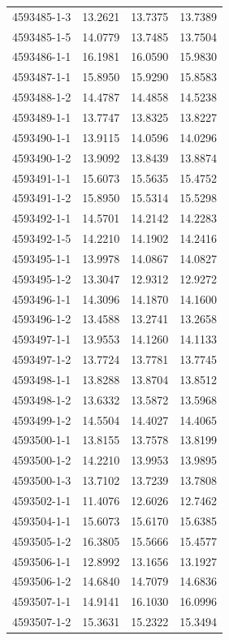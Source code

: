 \begin{longtable}{lrrr}
4593485-1-3 & 13.2621 & 13.7375 & 13.7389 \\
4593485-1-5 & 14.0779 & 13.7485 & 13.7504 \\
4593486-1-1 & 16.1981 & 16.0590 & 15.9830 \\
4593487-1-1 & 15.8950 & 15.9290 & 15.8583 \\
4593488-1-2 & 14.4787 & 14.4858 & 14.5238 \\
4593489-1-1 & 13.7747 & 13.8325 & 13.8227 \\
4593490-1-1 & 13.9115 & 14.0596 & 14.0296 \\
4593490-1-2 & 13.9092 & 13.8439 & 13.8874 \\
4593491-1-1 & 15.6073 & 15.5635 & 15.4752 \\
4593491-1-2 & 15.8950 & 15.5314 & 15.5298 \\
4593492-1-1 & 14.5701 & 14.2142 & 14.2283 \\
4593492-1-5 & 14.2210 & 14.1902 & 14.2416 \\
4593495-1-1 & 13.9978 & 14.0867 & 14.0827 \\
4593495-1-2 & 13.3047 & 12.9312 & 12.9272 \\
4593496-1-1 & 14.3096 & 14.1870 & 14.1600 \\
4593496-1-2 & 13.4588 & 13.2741 & 13.2658 \\
4593497-1-1 & 13.9553 & 14.1260 & 14.1133 \\
4593497-1-2 & 13.7724 & 13.7781 & 13.7745 \\
4593498-1-1 & 13.8288 & 13.8704 & 13.8512 \\
4593498-1-2 & 13.6332 & 13.5872 & 13.5968 \\
4593499-1-2 & 14.5504 & 14.4027 & 14.4065 \\
4593500-1-1 & 13.8155 & 13.7578 & 13.8199 \\
4593500-1-2 & 14.2210 & 13.9953 & 13.9895 \\
4593500-1-3 & 13.7102 & 13.7239 & 13.7808 \\
4593502-1-1 & 11.4076 & 12.6026 & 12.7462 \\
4593504-1-1 & 15.6073 & 15.6170 & 15.6385 \\
4593505-1-2 & 16.3805 & 15.5666 & 15.4577 \\
4593506-1-1 & 12.8992 & 13.1656 & 13.1927 \\
4593506-1-2 & 14.6840 & 14.7079 & 14.6836 \\
4593507-1-1 & 14.9141 & 16.1030 & 16.0996 \\
4593507-1-2 & 15.3631 & 15.2322 & 15.3494 \\

\end{longtable}
